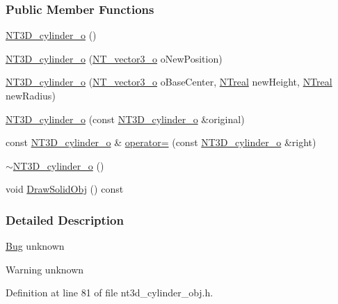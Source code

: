 \subsubsection*{Public Member Functions}
\begin{DoxyCompactItemize}
\item 
\hyperlink{class_n_t3_d__cylinder__o_a62cd8f30abaee91f667d46b9407726fc}{NT3D\_\-cylinder\_\-o} ()
\item 
\hyperlink{class_n_t3_d__cylinder__o_a4573cd4426d5b9ef6e8cf8e6580d21ee}{NT3D\_\-cylinder\_\-o} (\hyperlink{class_n_t__vector3__o}{NT\_\-vector3\_\-o} oNewPosition)
\item 
\hyperlink{class_n_t3_d__cylinder__o_a9b07b4e54ae375909ac04fe5a010a2a6}{NT3D\_\-cylinder\_\-o} (\hyperlink{class_n_t__vector3__o}{NT\_\-vector3\_\-o} oBaseCenter, \hyperlink{nt__types_8h_a814a97893e9deb1eedcc7604529ba80d}{NTreal} newHeight, \hyperlink{nt__types_8h_a814a97893e9deb1eedcc7604529ba80d}{NTreal} newRadius)
\item 
\hyperlink{class_n_t3_d__cylinder__o_a2bdf06857e58888436a78618c041a9f3}{NT3D\_\-cylinder\_\-o} (const \hyperlink{class_n_t3_d__cylinder__o}{NT3D\_\-cylinder\_\-o} \&original)
\item 
const \hyperlink{class_n_t3_d__cylinder__o}{NT3D\_\-cylinder\_\-o} \& \hyperlink{class_n_t3_d__cylinder__o_a53d2692c8c943effb7cedb2ac872af83}{operator=} (const \hyperlink{class_n_t3_d__cylinder__o}{NT3D\_\-cylinder\_\-o} \&right)
\item 
\hyperlink{class_n_t3_d__cylinder__o_a5b7068315a17f0d5595485c82d9b2655}{$\sim$NT3D\_\-cylinder\_\-o} ()
\item 
void \hyperlink{class_n_t3_d__cylinder__o_abfe52757698135d4425e5346da55daeb}{DrawSolidObj} () const 
\end{DoxyCompactItemize}


\subsubsection{Detailed Description}
\begin{Desc}
\item[\hyperlink{bug__bug000013}{Bug}]unknown \end{Desc}
\begin{DoxyWarning}{Warning}
unknown 
\end{DoxyWarning}


Definition at line 81 of file nt3d\_\-cylinder\_\-obj.h.



